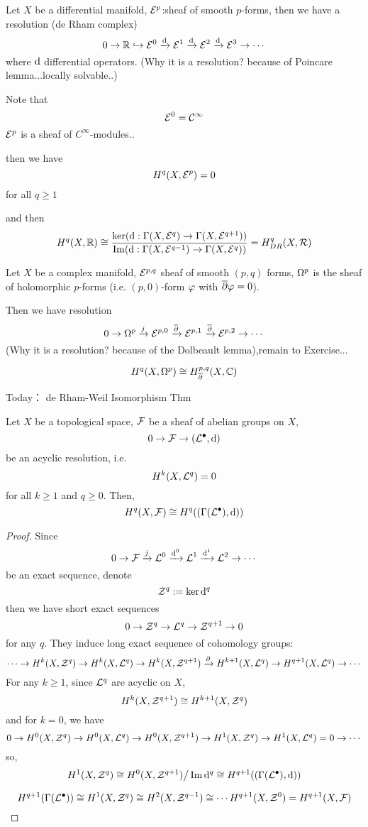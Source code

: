 \begin{example}
Let $X$ be a differential manifold,
$\mathcal{E}^p$:sheaf of smooth $p$-forms, then we have a resolution
(de Rham complex)
$$0\to\mathbb{R}\hookrightarrow\mathcal{E}^0\xrightarrow{\mathrm{d}}\mathcal{E}^1
\xrightarrow{\mathrm{d}}\mathcal{E}^2\xrightarrow{\mathrm{d}}\mathcal{E}^3\to\cdots$$
where $\mathrm{d}$ differential operators.
(Why it is a resolution? because of Poincare lemma...locally solvable..)

Note that
$$\mathcal{E}^0=\mathcal{C}^{\infty}$$
$\mathcal{E}^p$ is a sheaf of $C^{\infty}$-modules..

then we have
$$H^q(X,\mathcal{E}^p)=0$$
for all $q\geq1$

and then
$$H^q(X,\mathbb{R})\cong
\frac{\ker(\mathrm{d}:\Gamma(X,\mathcal{E}^q)\to\Gamma(X,\mathcal{E}^{q+1}))}
     {\operatorname{Im}(\mathrm{d}:\Gamma(X,\mathcal{E}^{q-1})\to\Gamma(X,\mathcal{E}^q))}
=H_{DR}^q(X,\mathcal{R})
$$
\end{example}

\begin{example}
Let $X$ be a complex manifold,
$\mathcal{E}^{p,q}$ sheaf of smooth $(p,q)$ forms,
$\Omega^p$ is the sheaf of holomorphic $p$-forms
(i.e. $(p,0)$-form $\varphi$ with $\overline{\partial}\varphi=0$).

Then we have resolution
$$0\to \Omega^p\xrightarrow{j}\mathcal{E}^{p,0}\xrightarrow{\overline{\partial}}\mathcal{E}^{p,1}\xrightarrow{\overline{\partial}}\mathcal{E}^{p,2}\to\cdots$$
(Why it is a resolution?  because of the Dolbeault lemma),remain to Exercise...

$$H^q(X,\Omega^p)\cong H^{p,q}_{\overline{\partial}}(X,\mathbb{C})$$
\end{example}


Today： de Rham-Weil Isomorphism Thm

\begin{thm}
Let $X$ be a topological space, $\mathcal{F}$ be a sheaf of abelian groups on $X$,
$$0\to\mathcal{F}\to(\mathcal{L}^{\bullet},\mathrm{d})$$
be an acyclic resolution, i.e.
$$H^k(X,\mathcal{L}^q)=0$$
for all $k\geq 1$ and $q\geq 0$.
Then,
$$H^q(X,\mathcal{F})\cong H^q((\Gamma(\mathcal{L}^{\bullet}),\mathrm{d}))$$
\end{thm}

\begin{proof}
Since
$$
0\to \mathcal{F}\xrightarrow{j}\mathcal{L}^0\xrightarrow{\mathrm{d}^0}\mathcal{L}^1\xrightarrow{\mathrm{d}^1}\mathcal{L}^2\to\cdots
$$
be an exact sequence, denote
$$\mathcal{Z}^q:=\ker \mathrm{d}^q$$
then we have short exact sequences
$$0\to \mathcal{Z}^q\to\mathcal{L}^q\to\mathcal{Z}^{q+1}\to 0$$
for any $q$. They induce long exact sequence of cohomology groups:
$$\cdots\to H^k(X,\mathcal{Z}^q)\to H^k(X,\mathcal{L}^q)\to H^k(X,\mathcal{Z}^{q+1})\xrightarrow{\partial}
H^{k+1}(X,\mathcal{L}^q)\to H^{q+1}(X,\mathcal{L}^q)\to\cdots$$
For any $k\geq 1$, since $\mathcal{L}^q$ are acyclic on $X$,
$$H^k(X,\mathcal{Z}^{q+1})\cong H^{k+1}(X,\mathcal{Z}^q)$$
and for $k=0$, we have
$$
0\to H^0(X,\mathcal{Z}^q)\to H^0(X,\mathcal{L}^q)\to H^0(X,\mathcal{Z}^{q+1})\to
H^1(X,\mathcal{Z}^q)\to H^1(X,\mathcal{L}^q)=0\to\cdots
$$
so,
$$H^1(X,\mathcal{Z}^q)\cong H^0(X,\mathcal{Z}^{q+1})\big/\operatorname{Im}\mathrm{d}^q
\cong H^{q+1}((\Gamma(\mathcal{L}^{\bullet}),\mathrm{d}))$$

$$H^{q+1}(\Gamma(\mathcal{L}^{\bullet}))\cong H^1(X,\mathcal{Z}^q)\cong H^2(X,\mathcal{Z}^{q-1})\cong\cdots
H^{q+1}(X,\mathcal{Z}^0)=H^{q+1}(X,\mathcal{F})$$
\end{proof}

